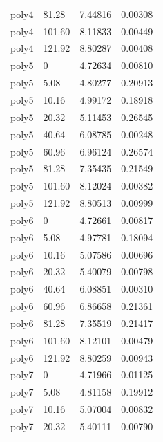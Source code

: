 \begin{onehalfspace}
\begin{longtable}{p{2.0cm} p{2.0cm} p{4.0cm} p{2.0cm} }
        poly4     & 81.28        & 7.44816          & 0.00308 \\
        poly4     & 101.60       & 8.11833          & 0.00449 \\
        poly4     & 121.92       & 8.80287          & 0.00408 \\
        \midrule
        poly5     & 0            & 4.72634          & 0.00810 \\
        poly5     & 5.08         & 4.80277          & 0.20913 \\
        poly5     & 10.16        & 4.99172          & 0.18918 \\
        poly5     & 20.32        & 5.11453          & 0.26545 \\
        poly5     & 40.64        & 6.08785          & 0.00248 \\
        poly5     & 60.96        & 6.96124          & 0.26574 \\
        poly5     & 81.28        & 7.35435          & 0.21549 \\
        poly5     & 101.60       & 8.12024          & 0.00382 \\
        poly5     & 121.92       & 8.80513          & 0.00999 \\
        \midrule
        poly6     & 0            & 4.72661          & 0.00817 \\
        poly6     & 5.08         & 4.97781          & 0.18094 \\
        poly6     & 10.16        & 5.07586          & 0.00696 \\
        poly6     & 20.32        & 5.40079          & 0.00798 \\
        poly6     & 40.64        & 6.08851          & 0.00310 \\
        poly6     & 60.96        & 6.86658          & 0.21361 \\
        poly6     & 81.28        & 7.35519          & 0.21417 \\
        poly6     & 101.60       & 8.12101          & 0.00479 \\
        poly6     & 121.92       & 8.80259          & 0.00943 \\
        \midrule
        poly7     & 0            & 4.71966          & 0.01125 \\
        poly7     & 5.08         & 4.81158          & 0.19912 \\
        poly7     & 10.16        & 5.07004          & 0.00832 \\
        poly7     & 20.32        & 5.40111          & 0.00790 \\

\end{longtable}
\end{onehalfspace}
